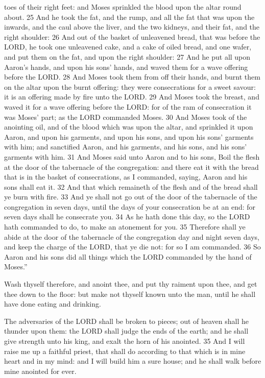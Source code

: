 \begin{description}
toes of their right feet: and Moses sprinkled the blood upon the altar round about. 25 And he took the fat, and the rump, and all the fat that was upon the inwards, and the caul above the liver, and the two kidneys, and their fat, and the right shoulder: 26 And out of the basket of unleavened bread, that was before the LORD, he took one unleavened cake, and a cake of oiled bread, and one wafer, and put them on the fat, and upon the right shoulder: 27 And he put all upon Aaron's hands, and upon his sons' hands, and waved them for a wave offering before the LORD. 28 And Moses took them from off their hands, and burnt them on the altar upon the burnt offering: they were consecrations for a sweet savour: it is an offering made by fire unto the LORD. 29 And Moses took the breast, and waved it for a wave offering before the LORD: for of the ram of consecration it was Moses' part; as the LORD commanded Moses. 30 And Moses took of the anointing oil, and of the blood which was upon the altar, and sprinkled it upon Aaron, and upon his garments, and upon his sons, and upon his sons' garments with him; and sanctified Aaron, and his garments, and his sons, and his sons' garments with him. 31 And Moses said unto Aaron and to his sons, Boil the flesh at the door of the tabernacle of the congregation: and there eat it with the bread that is in the basket of consecrations, as I commanded, saying, Aaron and his sons shall eat it. 32 And that which remaineth of the flesh and of the bread shall ye burn with fire. 33 And ye shall not go out of the door of the tabernacle of the congregation in seven days, until the days of your consecration be at an end: for seven days shall he consecrate you. 34 As he hath done this day, so the LORD hath commanded to do, to make an atonement for you. 35 Therefore shall ye abide at the door of the tabernacle of the congregation day and night seven days, and keep the charge of the LORD, that ye die not: for so I am commanded. 36 So Aaron and his sons did all things which the LORD commanded by the hand of Moses.''
		\item[Ruth 3:3] Wash thyself therefore, and anoint thee, and put thy raiment upon thee, and get thee down to the floor: but make not thyself known unto the man, until he shall have done eating and drinking.
		\item[1Sam 2:10, 35] The adversaries of the LORD shall be broken to pieces; out of heaven shall he thunder upon them: the LORD shall judge the ends of the earth; and he shall give strength unto his king, and exalt the horn of his anointed. 35 And I will raise me up a faithful priest, that shall do according to that which is in mine heart and in my mind: and I will build him a sure house; and he shall walk before mine anointed for ever.

\end{description}

